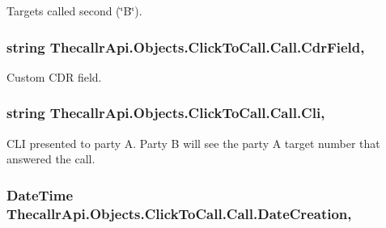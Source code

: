 Targets called second (\char`\"{}\+B\char`\"{}). 

\hypertarget{class_thecallr_api_1_1_objects_1_1_click_to_call_1_1_call_a5678a023993d4aebb7c436a9d60d1def}{
\subsubsection[{Cdr\+Field}]{\setlength{\rightskip}{0pt plus 5cm}string Thecallr\+Api.\+Objects.\+Click\+To\+Call.\+Call.\+Cdr\+Field\hspace{0.3cm}{\ttfamily [get]}, {\ttfamily [set]}}}\label{class_thecallr_api_1_1_objects_1_1_click_to_call_1_1_call_a5678a023993d4aebb7c436a9d60d1def}


Custom C\+D\+R field. 

\hypertarget{class_thecallr_api_1_1_objects_1_1_click_to_call_1_1_call_af2650b6ee1f0fe07a4afb29904e8812c}{
\subsubsection[{Cli}]{\setlength{\rightskip}{0pt plus 5cm}string Thecallr\+Api.\+Objects.\+Click\+To\+Call.\+Call.\+Cli\hspace{0.3cm}{\ttfamily [get]}, {\ttfamily [set]}}}\label{class_thecallr_api_1_1_objects_1_1_click_to_call_1_1_call_af2650b6ee1f0fe07a4afb29904e8812c}


C\+L\+I presented to party A. Party B will see the party A target number that answered the call. 

\hypertarget{class_thecallr_api_1_1_objects_1_1_click_to_call_1_1_call_a31aa6c9e2ee7c732832eed6dea689c1d}{
\subsubsection[{Date\+Creation}]{\setlength{\rightskip}{0pt plus 5cm}Date\+Time Thecallr\+Api.\+Objects.\+Click\+To\+Call.\+Call.\+Date\+Creation\hspace{0.3cm}{\ttfamily [get]}, {\ttfamily [set]}}}\label{class_thecallr_api_1_1_objects_1_1_click_to_call_1_1_call_a31aa6c9e2ee7c732832eed6dea689c1d}


